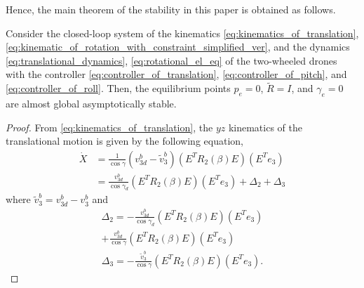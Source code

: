 Hence, the main theorem of the stability in this paper is obtained as follows.
\begin{theorem}
    Consider the closed-loop system of the kinematics \eqref{eq:kinematics_of_translation}, \eqref{eq:kinematic_of_rotation_with_constraint_simplified_ver}, and the dynamics \eqref{eq:translational_dynamics}, \eqref{eq:rotational_el_eq} of the two-wheeled drones with the controller \eqref{eq:controller_of_translation}, \eqref{eq:controller_of_pitch}, and \eqref{eq:controller_of_roll}.
    Then, the equilibrium points $ p_e = 0 $, $ \tilde{R} = I $, and $ \gamma_e = 0 $ are almost global asymptotically stable.
\end{theorem}
\begin{proof}
    From \eqref{eq:kinematics_of_translation}, the $ yz $ kinematics of the translational motion is given by the following equation,
    \begin{align}
        \dot{X} &= \frac{1}{\cos \gamma}(v_{3d}^b - \tilde{v}_{3}^b) (E^T R_2(\beta) E)(E^T e_3) \\
        &= \frac{v_{3d}^b}{\cos \gamma_d} (E^T R_2(\beta) E)(E^T e_3) + \Delta_2 + \Delta_3
        \label{eq:translation_kinematics_of_yz}
    \end{align}
    where $ \tilde{v}_{3}^b = v_{3d}^b - v_3^b $ and
    \begin{align}
        \label{eq:definition_of_Delta2}
        \Delta_2 = - \frac{v_{3d}^b}{\cos \gamma_d} (E^T R_2(\beta) E)(E^T e_3) \\
        + \frac{v_{3d}^b}{\cos \gamma} (E^T R_2(\beta) E)(E^T e_3)
    \end{align}
    \begin{align}
        \label{eq:definition_of_Delta3}
        \Delta_3 = - \frac{\tilde{v}_{3}^b}{\cos \gamma}  (E^T R_2(\beta) E)(E^T e_3).
    \end{align}

\end{proof}

